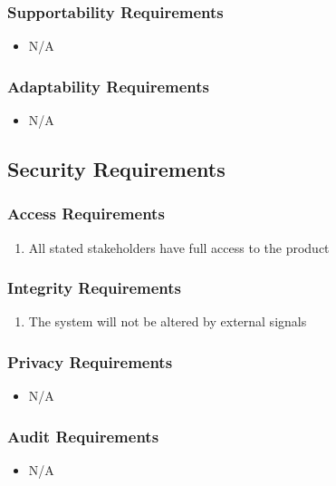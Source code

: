 \documentclass [12pt]{article}
\begin{document}
\subsubsection{Supportability Requirements }
	\begin{itemize}
		\item N/A
	\end{itemize}

\subsubsection{Adaptability Requirements}
	\begin{itemize}
		\item N/A
	\end{itemize}

\subsection{Security Requirements }
\subsubsection{Access Requirements }
	\begin{enumerate}[label=\textbf{\Alph*}:]
		\item All stated stakeholders have full access to the product
	\end{enumerate}

\subsubsection{Integrity Requirements }
	\begin{enumerate}[label=\textbf{\Alph*}:]
		\item The system will not be altered by external signals
	\end{enumerate}

\subsubsection{Privacy Requirements }
	\begin{itemize}
		\item N/A
	\end{itemize}

\subsubsection{Audit  Requirements }
	\begin{itemize}
		\item N/A
	\end{itemize} 
\end{document}
